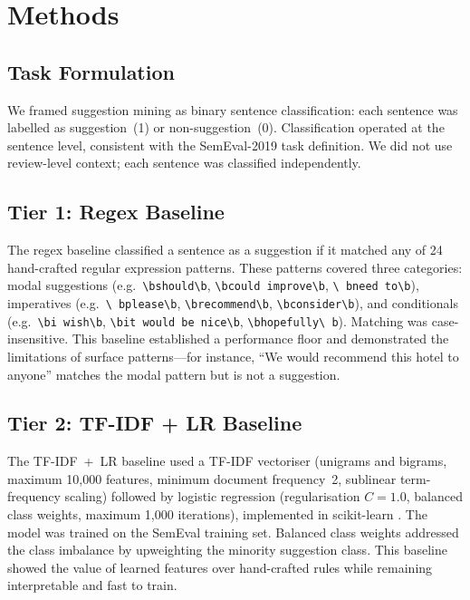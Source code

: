 \section{Methods}

\subsection{Task Formulation}

We framed suggestion mining as binary sentence classification:
each sentence was labelled as suggestion~(1) or
non-suggestion~(0). Classification operated at the sentence
level, consistent with the SemEval-2019 task definition. We did
not use review-level context; each sentence was classified
independently.

\subsection{Tier 1: Regex Baseline}

The regex baseline classified a sentence as a suggestion if it
matched any of 24 hand-crafted regular expression patterns.
These patterns covered three categories:
modal suggestions (e.g.\ \texttt{\textbackslash bshould\textbackslash b},
\texttt{\textbackslash bcould improve\textbackslash b}, \texttt{\textbackslash
bneed to\textbackslash b}), imperatives (e.g.\ \texttt{\textbackslash
bplease\textbackslash b}, \texttt{\textbackslash brecommend\textbackslash b},
\texttt{\textbackslash bconsider\textbackslash b}), and conditionals (e.g.\
\texttt{\textbackslash bi wish\textbackslash b}, \texttt{\textbackslash bit
would be nice\textbackslash b}, \texttt{\textbackslash bhopefully\textbackslash
b}). Matching was case-insensitive. This baseline established a
performance floor and demonstrated the limitations of surface
patterns---for instance, ``We would recommend this hotel to
anyone'' matches the modal pattern but is not a suggestion.

\subsection{Tier 2: TF-IDF + LR Baseline}

The TF-IDF~+~LR baseline used a TF-IDF vectoriser (unigrams
and bigrams, maximum 10,000 features, minimum document
frequency~2, sublinear term-frequency scaling) followed by
logistic regression (regularisation $C=1.0$, balanced class
weights, maximum 1,000 iterations), implemented in scikit-learn
\citep{pedregosa2011scikit}. The model was trained on the SemEval training set. Balanced
class weights addressed the class imbalance by upweighting the
minority suggestion class. This baseline showed the value of
learned features over hand-crafted rules while remaining
interpretable and fast to train.

